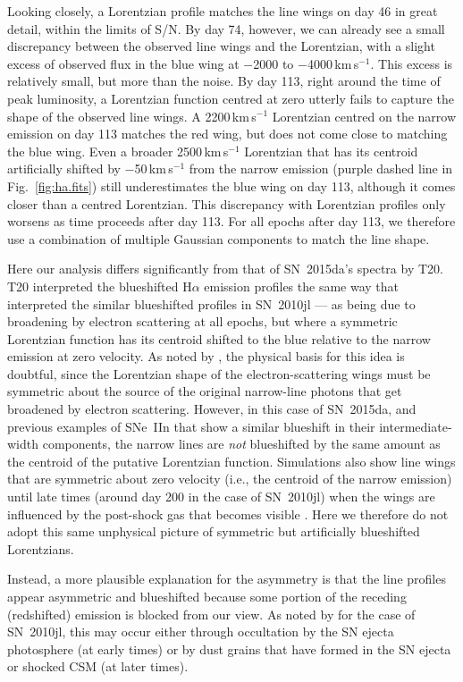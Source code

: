 \documentclass[fleqn,usenatbib,useAMS]{mnras}
\begin{document}
Looking closely, a Lorentzian profile matches the line wings on day 46
in great detail, within the limits of S/N.  By day 74,
however, we can already see a small discrepancy between the observed
line wings and the Lorentzian, with a slight excess of observed flux
in the blue wing at $-$2000 to $-$4000\,km\,s$^{-1}$.  This excess is
relatively small, but more than the noise.  By day 113, right around
the time of peak luminosity, a Lorentzian function centred at zero
utterly fails to capture the shape of the observed line wings.  A 2200\,km\,s$^{-1}$ Lorentzian centred on the narrow emission on day 113 matches the red wing, but does
not come close to matching the blue wing.  Even a broader
2500\,km\,s$^{-1}$ Lorentzian that has its centroid artificially shifted
by $-$50\,km\,s$^{-1}$ from the narrow emission (purple dashed  line in
Fig.~\ref{fig:ha.fits}) still underestimates the blue wing on day 113,
although it comes closer than a centred Lorentzian.  This discrepancy
with Lorentzian profiles only worsens as time proceeds after day 113.
For all epochs after day 113, we therefore use a combination of
multiple Gaussian components to match the line shape.

Here our analysis differs significantly from that of
SN~2015da's spectra by T20.  T20 interpreted the blueshifted H$\alpha$
emission profiles the same way that \citet{fransson14} interpreted
the similar blueshifted profiles in SN~2010jl --- as being due
to broadening by electron scattering at all epochs, but where a
symmetric Lorentzian function has its centroid shifted to the blue
relative to the narrow emission at zero velocity.  As noted by
\citet{smith20}, the physical basis for this idea is doubtful, since
the Lorentzian shape of the electron-scattering wings must be
symmetric about the source of the original narrow-line photons that
get broadened by electron scattering.  However, in this case of SN~2015da, and
previous examples of SNe~IIn that show a similar blueshift in their
intermediate-width components, the narrow lines are {\it not}
blueshifted by the same amount as the centroid of the putative
Lorentzian function.  Simulations also show line wings that are
symmetric about zero velocity (i.e., the centroid of the narrow
emission) until late times (around day 200 in the case of SN~2010jl)
when the wings are influenced by the post-shock gas that becomes
visible \citep{dessart15}.  Here we therefore do not adopt this same
unphysical picture of symmetric but artificially blueshifted
Lorentzians.

Instead, a more plausible explanation for the asymmetry is that the
line profiles appear asymmetric and blueshifted because some portion of
the receding (redshifted) emission is blocked from our view.  As noted
by \citet{smith12} for the case of SN~2010jl, this may occur either
through occultation by the SN
ejecta photosphere (at early times) or by dust grains
that have formed in the SN ejecta or shocked CSM (at
later times).
\end{document}
